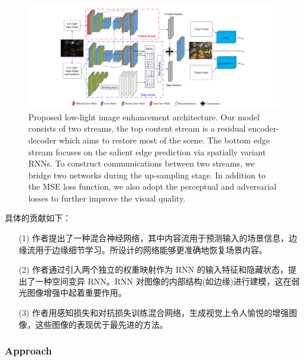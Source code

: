 \documentclass[a4paper, 10pt]{article}
\begin{document}
			\begin{figure}[htbp]
				\centering 
				\includegraphics[width=\columnwidth]{picture/LLIE/DHN/Architecture}
				\caption{
					\label{fig: DHN Architecture} 
					Proposed low-light image enhancement architecture. Our model consists of two streams, the top content stream is a residual encoder-decoder which aims to restore most of the scene. The bottom edge stream focuses on the salient edge prediction via spatially variant RNNs. To construct communications between two streams, we bridge two networks during the up-sampling stage. In addition to the MSE loss function, we also adopt the perceptual and adversarial
					losses to further improve the visual quality.
				}
			\end{figure}
			
			具体的贡献如下：
			
			\begin{itemize}
				\item[(1)] 
				作者提出了一种混合神经网络，其中内容流用于预测输入的场景信息，边缘流用于边缘细节学习。所设计的网络能够更准确地恢复场景内容。
				
				\item[(2)]
				作者通过引入两个独立的权重映射作为 RNN 的输入特征和隐藏状态，提出了一种空间变异 RNN。RNN 对图像的内部结构(如边缘)进行建模，这在弱光图像增强中起着重要作用。
				
				\item[(3)]
				作者用感知损失和对抗损失训练混合网络，生成视觉上令人愉悦的增强图像，这些图像的表现优于最先进的方法。
			\end{itemize}	
			
			\subsubsection{Approach}
			
\end{document}
